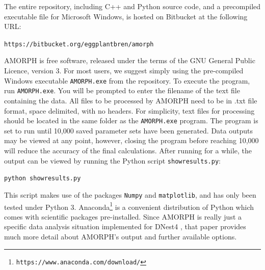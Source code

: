 \documentclass[preprint, a4paper]{elsarticle}
\begin{document}
The entire repository, including C++ and Python source code, and a 
precompiled executable file for Microsoft Windows,
is hosted on Bitbucket at the following URL:

\vspace{1em}
{\tt https://bitbucket.org/eggplantbren/amorph}
\vspace{1em}

AMORPH is free software, released under the terms of the GNU General Public
Licence, version 3.
For most users, we suggest simply using the pre-compiled Windows executable
{\tt AMORPH.exe} from the repository. To execute the program,
run {\tt AMORPH.exe}. You will be prompted to enter the filename of the text
file containing the data. All files to be processed by AMORPH need to be in .txt file format, space delimited, with no headers. For simplicity, text files for processing should be located in the same folder as the {\tt AMORPH.exe} program. The program is set to run until 10,000 saved parameter sets have been generated. Data outputs may be viewed at any point, however, closing the program before reaching  10,000 will reduce the accuracy of the final calculations. After running for a while, the output can be viewed
by running the Python script {\tt showresults.py}:

\vspace{1em}
{\tt python showresults.py}
\vspace{1em}

This script makes use of the packages {\tt Numpy} and {\tt matplotlib},
and has only been tested under Python 3. Anaconda\footnote{\tt https://www.anaconda.com/download/} is a convenient distribution
of Python which comes with scientific packages pre-installed.
Since AMORPH is really just a specific data analysis situation implemented
for DNest4 \citep{dnest4}, that paper provides much more detail about
AMORPH's output and further available options.
\end{document}
